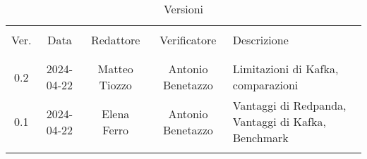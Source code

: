 \documentclass[italian,12pt]{article}
\begin{document}


\newpage



\begin{table}[!h]
	\caption{Versioni}
	\begin{center}
		\begin{tabular}{ c c c c p{6.1cm} }
			\hline                                                                                                     \\[-2ex]
			Ver. & Data       & Redattore     & Verificatore      & Descrizione                                        \\
			\\[-2ex] \hline \\[-1.5ex]
			0.2  & 2024-04-22 & Matteo Tiozzo & Antonio Benetazzo & Limitazioni di Kafka, comparazioni                 \\
			\hline
			0.1  & 2024-04-22 & Elena Ferro   & Antonio Benetazzo & Vantaggi di Redpanda, Vantaggi di Kafka, Benchmark \\
			\\[-1.5ex] \hline
		\end{tabular}
	\end{center}
\end{table}

\newpage

\tableofcontents

\newpage














\end{document}
